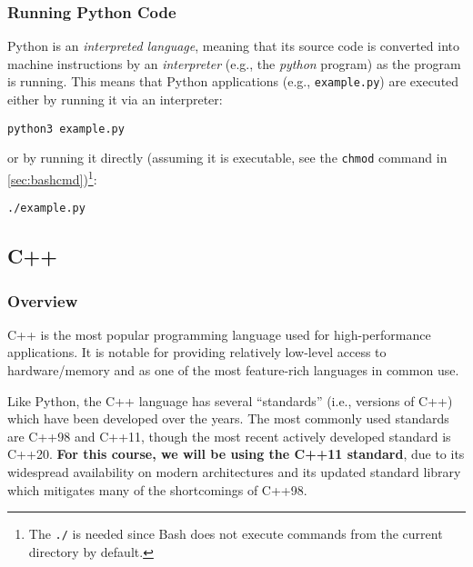 \documentclass[12pt]{article}
\begin{document}
\subsubsection{Running Python Code}
Python is an \emph{interpreted language}, meaning that its source code is converted into machine instructions by an \emph{interpreter} (e.g., the \emph{python} program) as the program is running.
This means that Python applications (e.g., \texttt{example.py}) are executed either by running it via an interpreter:
\begin{verbatim}
python3 example.py
\end{verbatim}
or by running it directly (assuming it is executable, see the \texttt{chmod} command in \ref{sec:bashcmd})\footnote{
    The \texttt{./} is needed since Bash does not execute commands from the current directory by default.
}:
\begin{verbatim}
./example.py
\end{verbatim}



\subsection{C++}
\subsubsection{Overview}
C++ is the most popular programming language used for high-performance applications.
It is notable for providing relatively low-level access to hardware/memory and as one of the most feature-rich languages in common use.

Like Python, the C++ language has several ``standards'' (i.e., versions of C++) which have been developed over the years.
The most commonly used standards are C++98 and C++11, though the most recent actively developed standard is C++20.
\textbf{For this course, we will be using the C++11 standard}, due to its widespread availability on modern architectures and its updated standard library which mitigates many of the shortcomings of C++98.
\end{document}
